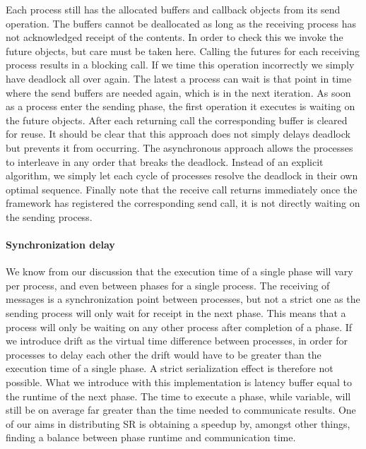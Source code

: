 Each process still has the allocated buffers and callback objects from its send operation. The buffers cannot be deallocated as long as the receiving process has not acknowledged receipt of the contents. In order to check this we invoke the future objects, but care must be taken here. Calling the futures for each receiving process results in a blocking call. If we time this operation incorrectly we simply have deadlock all over again. The latest a process can wait is that point in time where the send buffers are needed again, which is in the next iteration. As soon as a process enter the sending phase, the first operation it executes is waiting on the future objects. After each returning call the corresponding buffer is cleared for reuse. 
It should be clear that this approach does not simply delays deadlock but prevents it from occurring. The asynchronous approach allows the processes to interleave in any order that breaks the deadlock. Instead of an explicit algorithm, we simply let each cycle of processes resolve the deadlock in their own optimal sequence. Finally note that the receive call returns immediately once the framework has registered the corresponding send call, it is not directly waiting on the sending process.
\paragraph{Synchronization delay}
We know from our discussion that the execution time of a single phase will vary per process, and even between phases for a single process. The receiving of messages is a synchronization point between processes, but not a strict one as the sending process will only wait for receipt in the next phase. This means that a process will only be waiting on any other process after completion of a phase. If we introduce drift as the virtual time difference between processes, in order for processes to delay each other the drift would have to be greater than the execution time of a single phase. A strict serialization effect is therefore not possible. What we introduce with this implementation is latency buffer equal to the runtime of the next phase. The time to execute a phase, while variable, will still be on average far greater than the time needed to communicate results. One of our aims in distributing SR is obtaining a speedup by, amongst other things, finding a balance between phase runtime and communication time.
